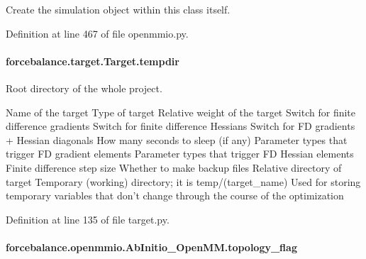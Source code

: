 Create the simulation object within this class itself. 



Definition at line 467 of file openmmio.\-py.

\hypertarget{classforcebalance_1_1target_1_1Target_aa1f01b5b78db253b5b66384ed11ed193}{
\paragraph[{tempdir}]{\setlength{\rightskip}{0pt plus 5cm}forcebalance.\-target.\-Target.\-tempdir\hspace{0.3cm}{\ttfamily [inherited]}}}\label{classforcebalance_1_1target_1_1Target_aa1f01b5b78db253b5b66384ed11ed193}


Root directory of the whole project. 

Name of the target Type of target Relative weight of the target Switch for finite difference gradients Switch for finite difference Hessians Switch for F\-D gradients + Hessian diagonals How many seconds to sleep (if any) Parameter types that trigger F\-D gradient elements Parameter types that trigger F\-D Hessian elements Finite difference step size Whether to make backup files Relative directory of target Temporary (working) directory; it is temp/(target\-\_\-name) Used for storing temporary variables that don't change through the course of the optimization 

Definition at line 135 of file target.\-py.

\hypertarget{classforcebalance_1_1openmmio_1_1AbInitio__OpenMM_ab4e95ab839ecd731ac7805c8a3ed08aa}{
\paragraph[{topology\-\_\-flag}]{\setlength{\rightskip}{0pt plus 5cm}forcebalance.\-openmmio.\-Ab\-Initio\-\_\-\-Open\-M\-M.\-topology\-\_\-flag}}\label{classforcebalance_1_1openmmio_1_1AbInitio__OpenMM_ab4e95ab839ecd731ac7805c8a3ed08aa}


